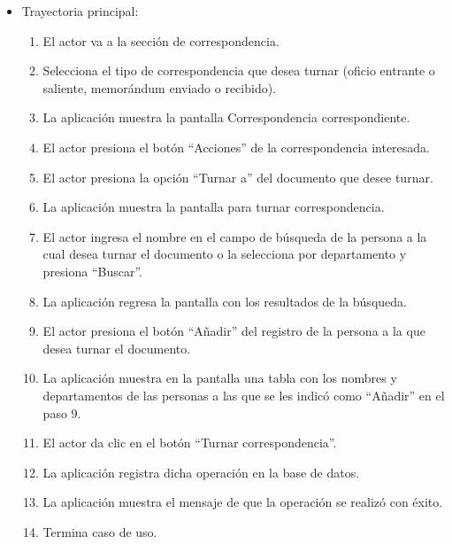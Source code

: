 \begin{itemize}
	\item Trayectoria principal:
	\begin{enumerate}
		\item	El actor va a la sección de correspondencia.
\item	Selecciona el tipo de correspondencia que desea turnar (oficio entrante o saliente, memorándum enviado o recibido).
\item	La aplicación muestra la pantalla  Correspondencia correspondiente.
\item	El actor presiona el botón “Acciones” de la correspondencia interesada.
\item	El actor presiona la opción “Turnar a” del documento que desee turnar.
\item	La aplicación muestra la pantalla  para turnar correspondencia.
\item	El actor ingresa el nombre en el campo de búsqueda de la persona a la cual desea turnar el documento o la selecciona por departamento y presiona “Buscar”.
\item	La aplicación regresa la pantalla con los resultados de la búsqueda.
\item	El actor presiona el botón “Añadir” del registro de la persona a la que desea turnar el documento.
\item	La aplicación muestra en la pantalla una tabla con los nombres y departamentos de las personas a las que se les indicó como “Añadir” en el paso 9.
\item	El actor da clic en el botón “Turnar correspondencia”.
\item	La aplicación registra dicha operación en la base de datos.
\item	La aplicación muestra el mensaje  de que la operación se realizó con éxito.
\item	Termina caso de uso.

	\end{enumerate}
	
\end{itemize}
\newpage
